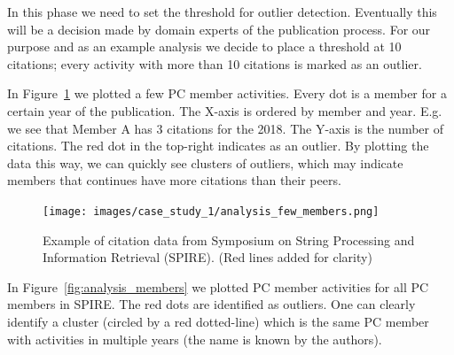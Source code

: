 \documentclass{ou-report}
\newcommand{\outline}[1]{{\color{blue} #1}}
\begin{document}
In this phase we need to set the threshold for outlier detection. Eventually
this will be a decision made by domain experts of the publication process.
For our purpose and as an example
analysis we decide to place a threshold at 10 citations; every activity with
more than 10 citations is marked as an outlier.










In Figure~\ref{fig:analysis_few} we plotted a few PC member activities. 
Every dot is a member for a certain year of the publication.
The X-axis is ordered by member and year. E.g. we see that 
Member A has 3 citations for the 2018. The Y-axis is the number of citations. 
The red dot in the 
top-right indicates as an outlier. By plotting the data this way, we can quickly
see clusters of outliers, which may indicate members that continues have more 
citations than their peers.

\begin{figure}[H]
    \centering
    \texttt{[image: images/case\_study\_1/analysis\_few\_members.png]}
    \caption{Example of citation data from Symposium on String Processing and 
    Information Retrieval (SPIRE). (Red lines added for clarity)}
    \label{fig:analysis_few}
\end{figure}



In Figure~\ref{fig:analysis_members} we plotted PC member activities for all PC 
members in SPIRE. The red dots are identified as outliers. One can clearly
identify a cluster (circled by a red dotted-line) which is the same PC member
with activities in multiple years (the name is known by the authors).
\end{document}
